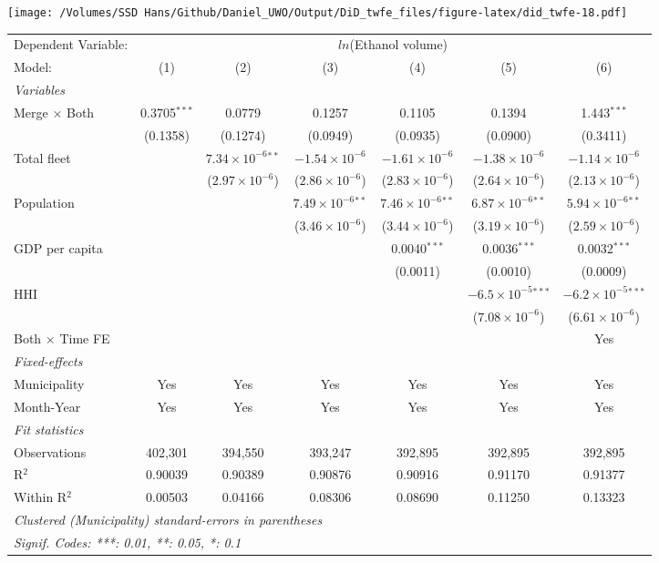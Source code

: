 \documentclass[
]{article}
\begin{document}
\texttt{[image: /Volumes/SSD Hans/Github/Daniel\_UWO/Output/DiD\_twfe\_files/figure-latex/did\_twfe-18.pdf]}

\begin{tabular}{lcccccc}
\tabularnewline\midrule\midrule
Dependent Variable:&\multicolumn{6}{c}{$ln$(Ethanol volume)}\\
Model:&(1) & (2) & (3) & (4) & (5) & (6)\\
\midrule \emph{Variables}&   &   &   &   &   &  \\
Merge $\times $ Both & 0.3705$^{***}$ & 0.0779 & 0.1257 & 0.1105 & 0.1394 & 1.443$^{***}$\\
  &(0.1358) & (0.1274) & (0.0949) & (0.0935) & (0.0900) & (0.3411)\\
Total fleet &    & $7.34\times 10^{-6}$$^{**}$ & $-1.54\times 10^{-6}$ & $-1.61\times 10^{-6}$ & $-1.38\times 10^{-6}$ & $-1.14\times 10^{-6}$\\
  &   & ($2.97\times 10^{-6}$) & ($2.86\times 10^{-6}$) & ($2.83\times 10^{-6}$) & ($2.64\times 10^{-6}$) & ($2.13\times 10^{-6}$)\\
Population &    &    & $7.49\times 10^{-6}$$^{**}$ & $7.46\times 10^{-6}$$^{**}$ & $6.87\times 10^{-6}$$^{**}$ & $5.94\times 10^{-6}$$^{**}$\\
  &   &    & ($3.46\times 10^{-6}$) & ($3.44\times 10^{-6}$) & ($3.19\times 10^{-6}$) & ($2.59\times 10^{-6}$)\\
GDP per capita &    &    &    & 0.0040$^{***}$ & 0.0036$^{***}$ & 0.0032$^{***}$\\
  &   &    &    & (0.0011) & (0.0010) & (0.0009)\\
HHI &    &    &    &    & $-6.5\times 10^{-5}$$^{***}$ & $-6.2\times 10^{-5}$$^{***}$\\
  &   &    &    &    & ($7.08\times 10^{-6}$) & ($6.61\times 10^{-6}$)\\
Both $\times$ Time FE &  &  &  &  &  & Yes\\
\midrule \emph{Fixed-effects}&   &   &   &   &   &  \\
Municipality & Yes & Yes & Yes & Yes & Yes & Yes\\
Month-Year & Yes & Yes & Yes & Yes & Yes & Yes\\
\midrule \emph{Fit statistics}&  & & & & & \\
Observations & 402,301&394,550&393,247&392,895&392,895&392,895\\
R$^2$ & 0.90039&0.90389&0.90876&0.90916&0.91170&0.91377\\
Within R$^2$ & 0.00503&0.04166&0.08306&0.08690&0.11250&0.13323\\
\midrule\midrule\multicolumn{7}{l}{\emph{Clustered (Municipality) standard-errors in parentheses}}\\
\multicolumn{7}{l}{\emph{Signif. Codes: ***: 0.01, **: 0.05, *: 0.1}}\\
\end{tabular}
\end{document}
